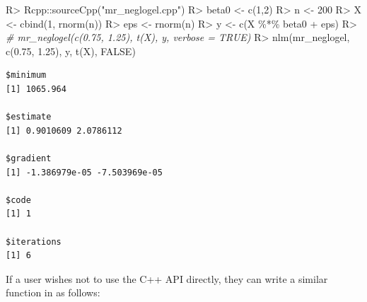 \documentclass[article]{jss}
\newenvironment{Shaded}{\begin{snugshade}}{\end{snugshade}}
\newcommand{\CommentTok}[1]{\textcolor[rgb]{0.56,0.35,0.01}{\textit{#1}}}
\newcommand{\ConstantTok}[1]{\textcolor[rgb]{0.00,0.00,0.00}{#1}}
\newcommand{\DecValTok}[1]{\textcolor[rgb]{0.00,0.00,0.81}{#1}}
\newcommand{\FloatTok}[1]{\textcolor[rgb]{0.00,0.00,0.81}{#1}}
\newcommand{\FunctionTok}[1]{\textcolor[rgb]{0.00,0.00,0.00}{#1}}
\newcommand{\NormalTok}[1]{#1}
\newcommand{\OtherTok}[1]{\textcolor[rgb]{0.56,0.35,0.01}{#1}}
\newcommand{\SpecialCharTok}[1]{\textcolor[rgb]{0.00,0.00,0.00}{#1}}
\newcommand{\StringTok}[1]{\textcolor[rgb]{0.31,0.60,0.02}{#1}}
\renewcommand{\|}{\,|\,}
\begin{document}
\begin{Shaded}
\begin{Highlighting}[]
\NormalTok{R}\SpecialCharTok{\textgreater{}}\NormalTok{ Rcpp}\SpecialCharTok{::}\FunctionTok{sourceCpp}\NormalTok{(}\StringTok{"mr\_neglogel.cpp"}\NormalTok{)}
\NormalTok{R}\SpecialCharTok{\textgreater{}}\NormalTok{ beta0 }\OtherTok{\textless{}{-}} \FunctionTok{c}\NormalTok{(}\DecValTok{1}\NormalTok{,}\DecValTok{2}\NormalTok{)}
\NormalTok{R}\SpecialCharTok{\textgreater{}}\NormalTok{ n }\OtherTok{\textless{}{-}} \DecValTok{200}
\NormalTok{R}\SpecialCharTok{\textgreater{}}\NormalTok{ X }\OtherTok{\textless{}{-}} \FunctionTok{cbind}\NormalTok{(}\DecValTok{1}\NormalTok{, }\FunctionTok{rnorm}\NormalTok{(n))}
\NormalTok{R}\SpecialCharTok{\textgreater{}}\NormalTok{ eps }\OtherTok{\textless{}{-}} \FunctionTok{rnorm}\NormalTok{(n)}
\NormalTok{R}\SpecialCharTok{\textgreater{}}\NormalTok{ y }\OtherTok{\textless{}{-}} \FunctionTok{c}\NormalTok{(X }\SpecialCharTok{\%*\%}\NormalTok{ beta0 }\SpecialCharTok{+}\NormalTok{ eps)}
\NormalTok{R}\SpecialCharTok{\textgreater{}} \CommentTok{\# mr\_neglogel(c(0.75, 1.25), t(X), y, verbose = TRUE)}
\NormalTok{R}\SpecialCharTok{\textgreater{}} \FunctionTok{nlm}\NormalTok{(mr\_neglogel, }\FunctionTok{c}\NormalTok{(}\FloatTok{0.75}\NormalTok{, }\FloatTok{1.25}\NormalTok{), y, }\FunctionTok{t}\NormalTok{(X), }\ConstantTok{FALSE}\NormalTok{)}
\end{Highlighting}
\end{Shaded}

\begin{verbatim}
$minimum
[1] 1065.964

$estimate
[1] 0.9010609 2.0786112

$gradient
[1] -1.386979e-05 -7.503969e-05

$code
[1] 1

$iterations
[1] 6
\end{verbatim}

If a user wishes not to use the C++ API directly, they can write a similar function in  as follows:
\end{document}
